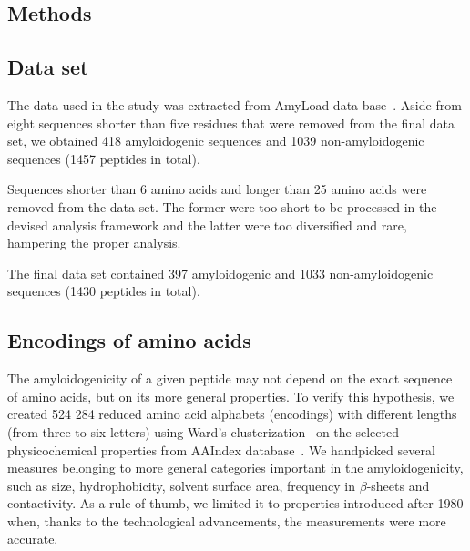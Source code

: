 \documentclass{bioinfo}
\begin{document}
\begin{methods}
\section{Methods}
\subsection{Data set}

The data used in the study was extracted from AmyLoad data 
base~\citep{wozniak_amyload:_2015}. Aside from eight sequences shorter than five 
residues that were removed from the final data set, we obtained 418 
amyloidogenic sequences and 1039 non-amyloidogenic sequences (1457 peptides in 
total).

  Sequences shorter than 6 amino acids and longer than 25 amino acids were 
removed from the data set. The former were too short to be processed in the 
%
%
%
devised analysis framework and the latter were too diversified and rare, 
hampering the proper analysis.

  The final data set contained 397 amyloidogenic and 1033 non-amyloidogenic 
sequences (1430 peptides in total). 

\subsection{Encodings of amino acids}

The amyloidogenicity of a given peptide may not depend on the exact sequence of 
amino acids, but on its more general properties. To verify this hypothesis, we 
 created 524 284 reduced amino acid alphabets (encodings) with different lengths 
%
%
(from three to six letters) using Ward's 
clusterization~\citep{jr_hierarchical_1963} on the selected physicochemical 
properties from AAIndex database~\citep{kawashima_aaindex:_2008}. We handpicked 
several measures belonging to more general categories important in the  
amyloidogenicity, such as size, hydrophobicity, solvent surface area, frequency 
in $\beta$-sheets and contactivity. As a rule of thumb, we limited it to 
properties introduced after 1980 when, thanks to the technological advancements, 
the measurements were more accurate.


\end{methods}
\end{document}
